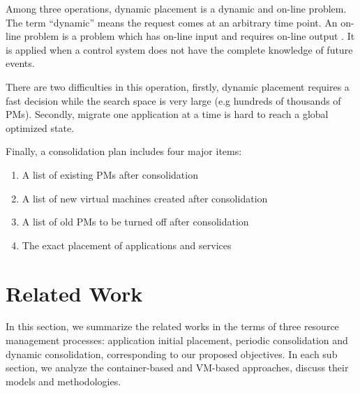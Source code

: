 \begin{enumerate}
	Among three operations, dynamic placement is a dynamic and on-line problem.
	The term ``dynamic'' means the request comes at an arbitrary time point. An on-line problem is a problem which has on-line input and requires on-line output \cite{Borodin:2cY4439E}. It is applied when a control system does not have the complete knowledge of future events.

	There are two difficulties in this operation, firstly, dynamic placement requires a fast decision while the search space is very large (e.g hundreds of thousands of PMs). Secondly, migrate one application at a time is hard to reach a global optimized state.

\end{enumerate}

Finally, a consolidation plan includes four major items:
			\begin{enumerate}
				\item A list of existing PMs after consolidation
				\item A list of new virtual machines created after consolidation
				\item A list of old PMs to be turned off after consolidation
				\item The exact placement of applications and services
			\end{enumerate}





\section{Related Work}
In this section, we summarize the related works in the terms of three resource management processes: application initial placement, periodic consolidation and dynamic consolidation, corresponding to our proposed objectives. In each sub section, we analyze the container-based and VM-based approaches, discuss their models and methodologies. 

